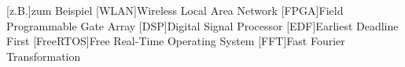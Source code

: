 \documentclass[../EDF Master Thesis.tex]{subfiles}
\begin{document}
    \begin{acronym}[abkuerzungen]
        [z.B.]{zum Beispiel}
        [WLAN]{Wireless Local Area Network}
        [FPGA]{Field Programmable Gate Array}
        [DSP]{Digital Signal Processor}
        [EDF]{Earliest Deadline First}
        [FreeRTOS]{Free Real-Time Operating System}
        [FFT]{Fast Fourier Transformation}
	\end{acronym}
\end{document}
